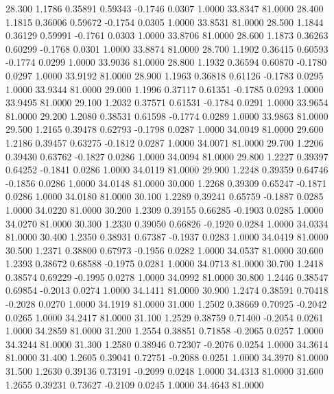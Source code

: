   28.300   1.1786   0.35891   0.59343  -0.1746   0.0307   1.0000  33.8347  81.0000
  28.400   1.1815   0.36006   0.59672  -0.1754   0.0305   1.0000  33.8531  81.0000
  28.500   1.1844   0.36129   0.59991  -0.1761   0.0303   1.0000  33.8706  81.0000
  28.600   1.1873   0.36263   0.60299  -0.1768   0.0301   1.0000  33.8874  81.0000
  28.700   1.1902   0.36415   0.60593  -0.1774   0.0299   1.0000  33.9036  81.0000
  28.800   1.1932   0.36594   0.60870  -0.1780   0.0297   1.0000  33.9192  81.0000
  28.900   1.1963   0.36818   0.61126  -0.1783   0.0295   1.0000  33.9344  81.0000
  29.000   1.1996   0.37117   0.61351  -0.1785   0.0293   1.0000  33.9495  81.0000
  29.100   1.2032   0.37571   0.61531  -0.1784   0.0291   1.0000  33.9654  81.0000
  29.200   1.2080   0.38531   0.61598  -0.1774   0.0289   1.0000  33.9863  81.0000
  29.500   1.2165   0.39478   0.62793  -0.1798   0.0287   1.0000  34.0049  81.0000
  29.600   1.2186   0.39457   0.63275  -0.1812   0.0287   1.0000  34.0071  81.0000
  29.700   1.2206   0.39430   0.63762  -0.1827   0.0286   1.0000  34.0094  81.0000
  29.800   1.2227   0.39397   0.64252  -0.1841   0.0286   1.0000  34.0119  81.0000
  29.900   1.2248   0.39359   0.64746  -0.1856   0.0286   1.0000  34.0148  81.0000
  30.000   1.2268   0.39309   0.65247  -0.1871   0.0286   1.0000  34.0180  81.0000
  30.100   1.2289   0.39241   0.65759  -0.1887   0.0285   1.0000  34.0220  81.0000
  30.200   1.2309   0.39155   0.66285  -0.1903   0.0285   1.0000  34.0270  81.0000
  30.300   1.2330   0.39050   0.66826  -0.1920   0.0284   1.0000  34.0334  81.0000
  30.400   1.2350   0.38931   0.67387  -0.1937   0.0283   1.0000  34.0419  81.0000
  30.500   1.2371   0.38800   0.67973  -0.1956   0.0282   1.0000  34.0537  81.0000
  30.600   1.2393   0.38672   0.68588  -0.1975   0.0281   1.0000  34.0713  81.0000
  30.700   1.2418   0.38574   0.69229  -0.1995   0.0278   1.0000  34.0992  81.0000
  30.800   1.2446   0.38547   0.69854  -0.2013   0.0274   1.0000  34.1411  81.0000
  30.900   1.2474   0.38591   0.70418  -0.2028   0.0270   1.0000  34.1919  81.0000
  31.000   1.2502   0.38669   0.70925  -0.2042   0.0265   1.0000  34.2417  81.0000
  31.100   1.2529   0.38759   0.71400  -0.2054   0.0261   1.0000  34.2859  81.0000
  31.200   1.2554   0.38851   0.71858  -0.2065   0.0257   1.0000  34.3244  81.0000
  31.300   1.2580   0.38946   0.72307  -0.2076   0.0254   1.0000  34.3614  81.0000
  31.400   1.2605   0.39041   0.72751  -0.2088   0.0251   1.0000  34.3970  81.0000
  31.500   1.2630   0.39136   0.73191  -0.2099   0.0248   1.0000  34.4313  81.0000
  31.600   1.2655   0.39231   0.73627  -0.2109   0.0245   1.0000  34.4643  81.0000
